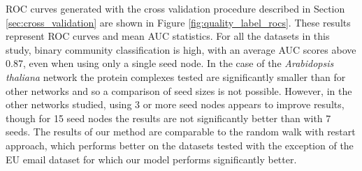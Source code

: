 \documentclass[sigconf]{acmart}
\begin{document}
ROC curves generated with the cross validation procedure described in Section \ref{sec:cross_validation} are shown in Figure \ref{fig:quality_label_rocs}.
These results represent ROC curves and mean AUC statistics.
For all the datasets in this study, binary community classification is high, with an average AUC scores above 0.87, even when using only a single seed node.
In the case of the \textit{Arabidopsis thaliana} network the protein complexes tested are significantly smaller than for other networks and so a comparison of seed sizes is not possible.
However, in the other networks studied, using 3 or more seed nodes appears to improve results, though for 15 seed nodes the results are not significantly better than with 7 seeds.
The results of our method are comparable to the random walk with restart approach, which performs better on the datasets tested with the exception of the EU email dataset for which our model performs significantly better.
\end{document}
